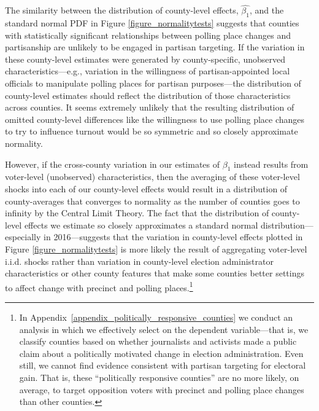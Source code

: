 \documentclass[12pt]{article}
\begin{document}
The similarity between the distribution of county-level effects, $\hat{\beta_{1}}$, and the standard normal PDF in Figure \ref{figure_normalitytests} suggests that counties with statistically significant relationships between polling place changes and partisanship are unlikely to be engaged in partisan targeting.  If the variation in these county-level estimates were generated by county-specific, unobserved characteristics---e.g., variation in the willingness of partisan-appointed local officials to manipulate polling places for partisan purposes---the distribution of county-level estimates should reflect the distribution of those characteristics across counties.  It seems extremely unlikely that the resulting distribution of omitted county-level differences like the willingness to use polling place changes to try to influence turnout would be so symmetric and so closely approximate normality.

However, if the cross-county variation in our estimates of $\beta_{1}$ instead results from voter-level (unobserved) characteristics, then the averaging of these voter-level shocks into each of our county-level effects would result in a distribution of county-averages that converges to normality as the number of counties goes to infinity by the Central Limit Theory.  The fact that the distribution of county-level effects we estimate so closely approximates a standard normal distribution---especially in 2016---suggests that the variation in county-level effects plotted in Figure \ref{figure_normalitytests} is more likely the result of aggregating voter-level i.i.d. shocks rather than variation in county-level election administrator characteristics or other county features that make some counties better settings to affect change with precinct and polling places.\footnote{In Appendix~\ref{appendix_politically_responsive_counties} we conduct an analysis in which we effectively select on the dependent variable---that is, we classify counties based on whether journalists and activists made a public claim about a politically motivated change in election administration.  Even still, we cannot find evidence consistent with partisan targeting for electoral gain.   That is, these ``politically responsive counties'' are no more likely, on average, to target opposition voters with precinct and polling place changes than other counties. }
\end{document}
